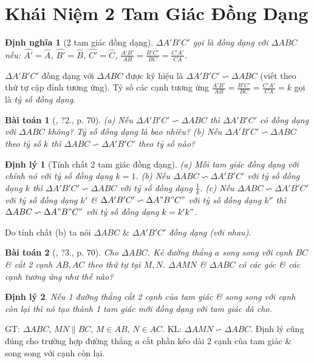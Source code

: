 \documentclass{article}
\newtheorem{baitoan}{Bài toán}
\newtheorem{dinhly}{Định lý}
\newtheorem{dinhnghia}{Định nghĩa}
\begin{document}

\section{Khái Niệm 2 Tam Giác Đồng Dạng}

\begin{dinhnghia}[2 tam giác đồng dạng]
	$\Delta A'B'C'$ gọi là \emph{đồng dạng} với $\Delta ABC$ nếu: $\widehat{A'} = \widehat{A}$, $\widehat{B'} = \widehat{B}$, $\widehat{C'} = \widehat{C}$, $\frac{A'B'}{AB} = \frac{B'C'}{BC} = \frac{C'A'}{CA}$.
\end{dinhnghia}
$\Delta A'B'C'$ đồng dạng với $\Delta ABC$ được ký hiệu là $\Delta A'B'C'\backsim\Delta ABC$ (viết theo thứ tự cặp đỉnh tương ứng). Tỷ số các cạnh tương ứng $\frac{A'B'}{AB} = \frac{B'C'}{BC} = \frac{C'A'}{CA} = k$ gọi là \textit{tỷ số đồng dạng}.

\begin{baitoan}[\cite{SGK_Toan_8_tap_2}, ?2., p. 70]
	(a) Nếu $\Delta A'B'C'\backsim\Delta ABC$ thì $\Delta A'B'C'$ có đồng dạng với $\Delta ABC$ không? Tỷ số đồng dạng là bao nhiêu? (b) Nếu $\Delta A'B'C'\backsim\Delta ABC$ theo tỷ số $k$ thì $\Delta ABC\backsim\Delta A'B'C'$ theo tỷ số nào?
\end{baitoan}

\begin{dinhly}[Tính chất 2 tam giác đồng dạng]
	(a) Mỗi tam giác đồng dạng với chính nó với tỷ số đồng dạng $k = 1$. (b) Nếu $\Delta ABC\backsim\Delta A'B'C'$ với tỷ số đồng dạng $k$ thì $\Delta A'B'C'\backsim\Delta ABC$ với tỷ số đồng dạng $\frac{1}{k}$. (c) Nếu $\Delta ABC\backsim\Delta A'B'C'$ với tỷ số đồng dạng $k'$ \& $\Delta A'B'C'\backsim\Delta A"B"C"$ với tỷ số đồng dạng $k''$ thì $\Delta ABC\backsim\Delta A"B"C"$ với tỷ số đồng dạng $k = k'k"$.
\end{dinhly}
Do tính chất (b) ta nói $\Delta ABC$ \& $\Delta A'B'C'$ \textit{đồng dạng (với nhau)}.

\begin{baitoan}[\cite{SGK_Toan_8_tap_2}, ?3., p. 70]
	Cho $\Delta ABC$. Kẻ đường thẳng $a$ song song với cạnh $BC$ \& cắt 2 cạnh $AB,AC$ theo thứ tự tại $M,N$. $\Delta AMN$ \& $\Delta ABC$ có các góc \& các cạnh tương ứng như thế nào?
\end{baitoan}

\begin{dinhly}
	Nếu 1 đường thẳng cắt 2 cạnh của tam giác \& song song với cạnh còn lại thì nó tạo thành 1 tam giác mới đồng dạng với tam giác đã cho.
\end{dinhly}
GT: $\Delta ABC$, $MN\parallel BC$, $M\in AB$, $N\in AC$. KL: $\Delta AMN\backsim\Delta ABC$. Định lý cũng đúng cho trường hợp đường thẳng $a$ cắt phần kéo dài 2 cạnh của tam giác \& song song với cạnh còn lại.
\end{document}

